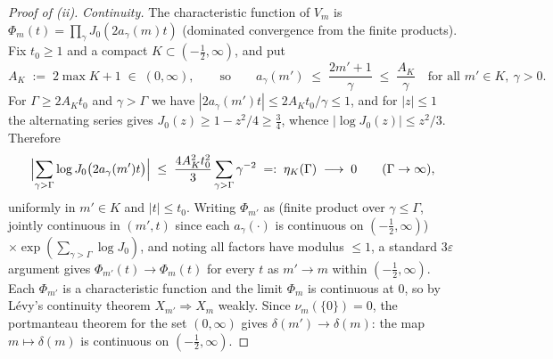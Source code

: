 \documentclass[11pt]{article}
\begin{document}
\begin{proof}[Proof of (ii)]
\emph{Continuity.} The characteristic function of $V_m$ is
$\Phi_m(t)=\prod_{\gamma}J_0(2a_\gamma(m)t)$ (dominated convergence
from the finite products). Fix $t_0\ge1$ and a compact
$K\subset(-\tfrac12,\infty)$, and put
\[
A_K\;:=\;2\max K+1\;\in\;(0,\infty),
\qquad\text{so}\qquad
a_\gamma(m')\;\le\;\frac{2m'+1}{\gamma}\;\le\;\frac{A_K}{\gamma}
\quad\text{for all } m'\in K,\ \gamma>0 .
\]
For $\Gamma\ge2A_Kt_0$ and $\gamma>\Gamma$ we have
$|2a_\gamma(m')t|\le 2A_Kt_0/\gamma\le1$, and for $|z|\le1$ the
alternating series gives $J_0(z)\ge1-z^2/4\ge\tfrac34$, whence
$|\log J_0(z)|\le z^2/3$. Therefore
\[
\Bigl|\sum_{\gamma>\Gamma}\log J_0\bigl(2a_\gamma(m')t\bigr)\Bigr|
\;\le\;\frac{4A_K^2t_0^2}{3}\sum_{\gamma>\Gamma}\gamma^{-2}
\;=:\;\eta_K(\Gamma)\;\longrightarrow\;0\qquad(\Gamma\to\infty),
\]
uniformly in $m'\in K$ and $|t|\le t_0$. Writing $\Phi_{m'}$ as (finite
product over $\gamma\le\Gamma$, jointly continuous in $(m',t)$ since
each $a_\gamma(\cdot)$ is continuous on $(-\tfrac12,\infty)$)
$\times\exp(\sum_{\gamma>\Gamma}\log J_0)$, and noting all factors
have modulus $\le1$, a standard $3\varepsilon$ argument gives
$\Phi_{m'}(t)\to\Phi_m(t)$ for every $t$ as $m'\to m$ within
$(-\tfrac12,\infty)$. Each $\Phi_{m'}$ is a characteristic function and
the limit $\Phi_m$ is continuous at $0$, so by L\'evy's continuity
theorem $X_{m'}\Rightarrow X_m$ weakly. Since $\nu_m(\{0\})=0$, the
portmanteau theorem for the set $(0,\infty)$ gives
$\delta(m')\to\delta(m)$: the map $m\mapsto\delta(m)$ is continuous on
$(-\tfrac12,\infty)$.
\end{proof}
\end{document}
